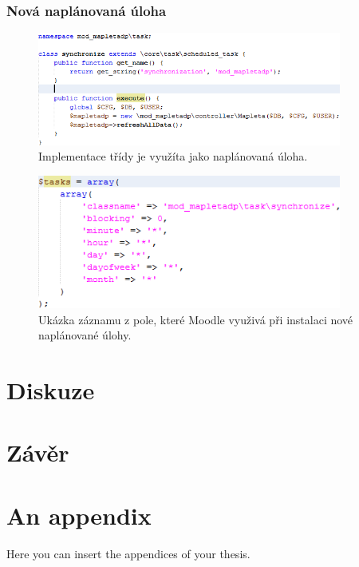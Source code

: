 \documentclass[
print,
  11pt,
  table,   
  nolof,    
  nolot,
  oneside,
  final
]{fithesis3}
\begin{document}
		\subsection{Nová naplánovaná úloha}

		\begin{figure}
		  \begin{center}
		    \includegraphics[width=100mm]{images/cron-trida.png}
		   \end{center}
		  \caption{Implementace třídy je využíta jako naplánovaná úloha. }
		  \label{fig:crontrida}
		\end{figure}

		\begin{figure}
		  \begin{center}
		    \includegraphics[width=100mm]{images/cron-registrace.png}
		   \end{center}
		  \caption{Ukázka záznamu z pole, které Moodle využivá při instalaci nové naplánované úlohy.}
		  \label{fig:cronregistrace}
		\end{figure}
\chapter{Diskuze}

\chapter{Závěr}




\printbibliography[heading=bibintoc]
\listoffigures
\listoftables




\makeatletter\thesis@blocks@clear\makeatother
{} %

\makeatletter\thesis@blocks@clear\makeatother

\renewcommand{\theHchapter}{A\arabic{chapter}}
\appendix %

\chapter{An appendix}
Here you can insert the appendices of your thesis.
\end{document}
